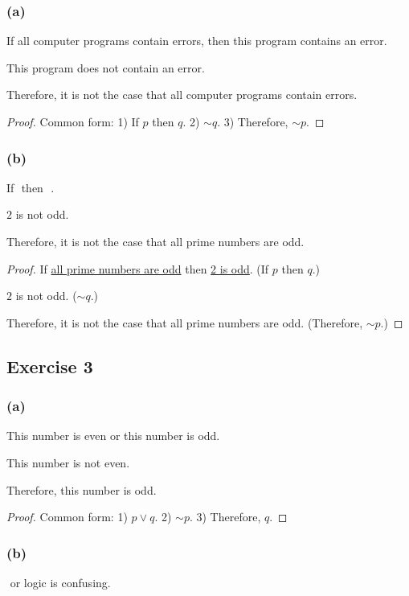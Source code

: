 \documentclass[14pt]{extarticle}
\newcommand{\fbl}{\underline{\hspace{1cm}}\,\,}
\begin{document}
\subsubsection{(a)}
If all computer programs contain errors, then this program contains an error.

This program does not contain an error.

Therefore, it is not the case that all computer programs contain errors.

\begin{proof}
    Common form: 1) If $p$ then $q$. 2) $\sim q$. 3) Therefore, $\sim p$.
\end{proof}

\subsubsection{(b)}
If \fbl then \fbl.

$2$ is not odd.

Therefore, it is not the case that all prime numbers are odd.

\begin{proof}
    If \underline{all prime numbers are odd} then \underline{2 is
        odd}. (If $p$ then $q$.)

    $2$ is not odd. ($\sim q$.)

    Therefore, it is not the case that all prime numbers are odd. (Therefore, $\sim p$.)
\end{proof}

\subsection{Exercise 3}
\subsubsection{(a)}
This number is even or this number is odd.

This number is not even.

Therefore, this number is odd.

\begin{proof}
    Common form: 1) $p \vee q$. 2) $\sim p$. 3) Therefore, $q$.
\end{proof}

\subsubsection{(b)}
\fbl or logic is confusing.
\end{document}
